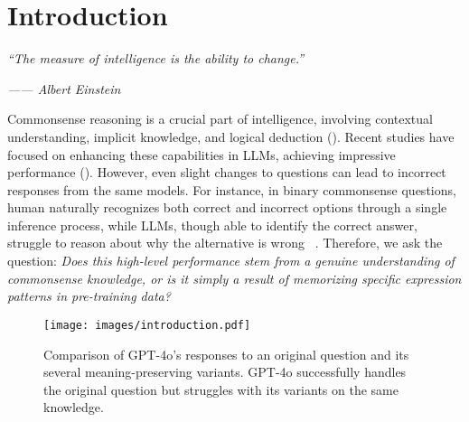 \section{Introduction}

\textit{``The measure of intelligence is the ability to change.''}

\textit{\hfill—— Albert Einstein}

Commonsense reasoning is a crucial part of intelligence, involving contextual understanding, implicit knowledge, and logical deduction (\citealp{liu2004conceptnet, cambria2011isanette, davis2015commonsense}). 
Recent studies have focused on enhancing these capabilities in LLMs, achieving impressive performance (\citealp{yang2024qwen2, openai2024gpt, team2024gemini}). However, even slight changes to questions can lead to incorrect responses from the same models.
For instance, in binary commonsense questions, human naturally recognizes both correct and incorrect options through a single inference process, while LLMs, though able to identify the correct answer, struggle to reason about why the alternative is wrong ~\cite{balepur2024s}. 
Therefore, we ask the question:
\textit{Does this high-level performance stem from a genuine understanding of commonsense knowledge, or is it simply a result of memorizing specific expression patterns in pre-training data?}


\begin{figure}[t]   
\centering
\setlength{\abovecaptionskip}{-0.10cm}
\setlength{\belowcaptionskip}{0cm}
\texttt{[image: images/introduction.pdf]}
\caption{Comparison of GPT-4o's responses to an original question and its several meaning-preserving variants. GPT-4o successfully handles the original question but struggles with its variants on the same knowledge.}
\label{example}
\vspace{-10pt}
\end{figure}

